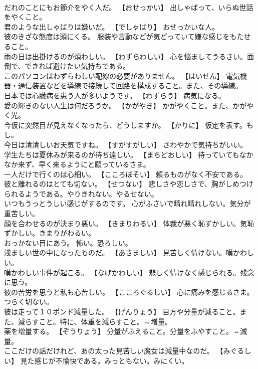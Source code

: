 \documentclass[8pt]{extreport}
\begin{document}
\begin{CJK}{UTF8}{min}
\\	だれのことにもお節介をやく人だ。	【おせっかい】 出しゃばって、いらぬ世話をやくこと。
\\	君のような出しゃばりは嫌いだ。	【でしゃばり】 おせっかいな人。
\\	彼のきざな態度は頭にくる。	服装や言動などが気どっていて嫌な感じをもたせること。
\\	雨の日は出掛けるのが煩わしい。	【わずらわしい】 心を悩ましてうるさい。面倒で、できれば避けたい気持ちである。
\\	このパソコンはわずらわしい配線の必要がありません。	【はいせん】 電気機器・通信装置などを導線で接続して回路を構成すること。また、その導線。
\\	日本では心臓病を患う人が多いようです。	【わずらう】 病気になる。
\\	愛の輝きのない人生は何だろうか。	【かがやき】 かがやくこと。また、かがやく光。
\\	今仮に突然目が見えなくなったら、どうしますか。	【かりに】 仮定を表す。もし。
\\	今日は清清しいお天気ですね。	【すがすがしい】 さわやかで気持ちがいい。
\\	学生たちは夏休みが来るのが待ち遠しい。	【まちどおしい】 待っていてもなかなか来ず、早く来るようにと願っているさま。
\\	一人だけで行くのは心細い。	【こころぼそい】 頼るものがなく不安である。
\\	彼と離れるのはとても切ない。	【せつない】 悲しさや恋しさで、胸がしめつけられるようである。やりきれない。やるせない。
\\	いつもうっとうしい感じがするのです。	心がふさいで晴れ晴れしない。気分が重苦しい。
\\	顔を合わせるのが決まり悪い。	【きまりわるい】 体裁が悪く恥ずかしい。気恥ずかしい。きまりがわるい。
\\	おっかない目にあう。	怖い。恐ろしい。
\\	浅ましい世の中になったものだ。	【あさましい】 見苦しく情けない。嘆かわしい。
\\	嘆かわしい事件が起こる。	【なげかわしい】 悲しく情けなく感じられる。残念に思う。
\\	彼の苦労を思うと私も心苦しい。	【こころぐるしい】 心に痛みを感じるさま。つらく切ない。
\\	彼は走って１０ポンド減量した。	【げんりょう】 目方や分量が減ること。また、減らすこと。特に、体重を減らすこと。⇔増量。
\\	薬を増量する。	【ぞうりょう】 分量がふえること。分量をふやすこと。⇔減量。
\\	ここだけの話だけれど、あの太った見苦しい魔女は減量中なのだ。	【みぐるしい】 見た感じが不愉快である。みっともない。みにくい。

\end{CJK}
\end{document}
